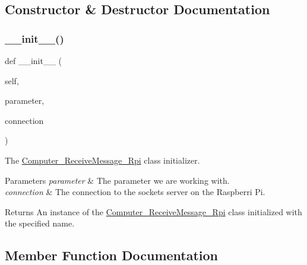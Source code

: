 \subsection{Constructor \& Destructor Documentation}
\mbox{\label{classRET__socket_1_1Computer__ReceiveMessage__Rpi_a1370d57533cdac08e579f9012c0bcd7d}} 
\subsubsection{\texorpdfstring{\+\_\+\+\_\+init\+\_\+\+\_\+()}{\_\_init\_\_()}}
{\footnotesize\ttfamily def \+\_\+\+\_\+init\+\_\+\+\_\+ (\begin{DoxyParamCaption}\item[{}]{self,  }\item[{}]{parameter,  }\item[{}]{connection }\end{DoxyParamCaption})}



The \hyperlink{classRET__socket_1_1Computer__ReceiveMessage__Rpi}{Computer\+\_\+\+Receive\+Message\+\_\+\+Rpi} class initializer. 


\begin{DoxyParams}{Parameters}
{\em parameter} & The parameter we are working with. \\
\hline
{\em connection} & The connection to the socket\textquotesingle{}s server on the Raspberri Pi. \\
\hline
\end{DoxyParams}
\begin{DoxyReturn}{Returns}
An instance of the \hyperlink{classRET__socket_1_1Computer__ReceiveMessage__Rpi}{Computer\+\_\+\+Receive\+Message\+\_\+\+Rpi} class initialized with the specified name. 
\end{DoxyReturn}


\subsection{Member Function Documentation}
\mbox{\label{classRET__socket_1_1Computer__ReceiveMessage__Rpi_ad22709b2e67308af35f55680d5a026e0}} 
